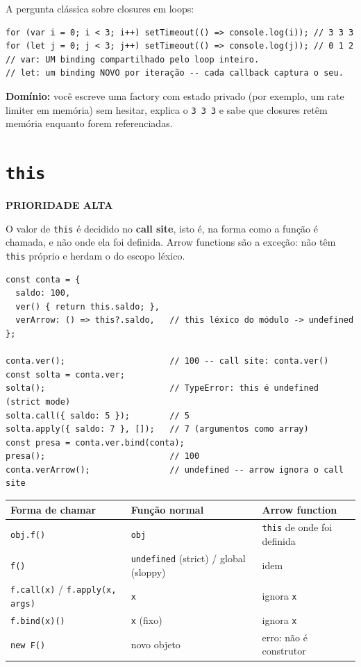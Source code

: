 \documentclass[12pt,a4paper,oneside]{book}
\newcommand{\alta}{\colorbox{red!15}{\sffamily\scriptsize\bfseries PRIORIDADE ALTA}}
\newcommand{\code}[1]{\texttt{#1}}
\newcommand{\dom}[1]{\begin{dominio}\textbf{Domínio:} #1\end{dominio}}
\begin{document}
A pergunta clássica sobre closures em loops:

\begin{verbatim}
for (var i = 0; i < 3; i++) setTimeout(() => console.log(i)); // 3 3 3
for (let j = 0; j < 3; j++) setTimeout(() => console.log(j)); // 0 1 2
// var: UM binding compartilhado pelo loop inteiro.
// let: um binding NOVO por iteração -- cada callback captura o seu.
\end{verbatim}

\dom{você escreve uma factory com estado privado (por exemplo, um rate limiter em memória) sem hesitar, explica o \code{3 3 3} e sabe que closures retêm memória enquanto forem referenciadas.}

\section{\texttt{this}}
\label{sec:this}
\alta

O valor de \code{this} é decidido no \textbf{call site}, isto é, na forma como a função é chamada, e não onde ela foi definida. Arrow functions são a exceção: não têm \code{this} próprio e herdam o do escopo léxico.

\begin{verbatim}
const conta = {
  saldo: 100,
  ver() { return this.saldo; },
  verArrow: () => this?.saldo,   // this léxico do módulo -> undefined
};

conta.ver();                     // 100 -- call site: conta.ver()
const solta = conta.ver;
solta();                         // TypeError: this é undefined (strict mode)
solta.call({ saldo: 5 });        // 5
solta.apply({ saldo: 7 }, []);   // 7 (argumentos como array)
const presa = conta.ver.bind(conta);
presa();                         // 100
conta.verArrow();                // undefined -- arrow ignora o call site
\end{verbatim}

\begin{center}
\begin{tabular}{@{}lll@{}}
\toprule
\textbf{Forma de chamar} & \textbf{Função normal} & \textbf{Arrow function} \\
\midrule
\code{obj.f()} & \code{obj} & \code{this} de onde foi definida \\
\code{f()} & \code{undefined} (strict) / global (sloppy) & idem \\
\code{f.call(x)} / \code{f.apply(x, args)} & \code{x} & ignora \code{x} \\
\code{f.bind(x)()} & \code{x} (fixo) & ignora \code{x} \\
\code{new F()} & novo objeto & erro: não é construtor \\
\bottomrule
\end{tabular}
\end{center}
\end{document}
